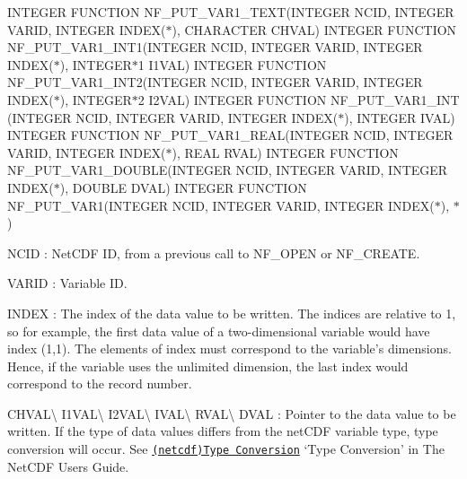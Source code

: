 I\+N\+T\+E\+G\+ER F\+U\+N\+C\+T\+I\+ON N\+F\+\_\+\+P\+U\+T\+\_\+\+V\+A\+R1\+\_\+\+T\+E\+XT(I\+N\+T\+E\+G\+ER N\+C\+ID, I\+N\+T\+E\+G\+ER V\+A\+R\+ID, I\+N\+T\+E\+G\+ER I\+N\+D\+E\+X($\ast$), C\+H\+A\+R\+A\+C\+T\+ER C\+H\+V\+AL) I\+N\+T\+E\+G\+ER F\+U\+N\+C\+T\+I\+ON N\+F\+\_\+\+P\+U\+T\+\_\+\+V\+A\+R1\+\_\+\+I\+N\+T1(I\+N\+T\+E\+G\+ER N\+C\+ID, I\+N\+T\+E\+G\+ER V\+A\+R\+ID, I\+N\+T\+E\+G\+ER I\+N\+D\+E\+X($\ast$), I\+N\+T\+E\+G\+E\+R$\ast$1 I1\+V\+AL) I\+N\+T\+E\+G\+ER F\+U\+N\+C\+T\+I\+ON N\+F\+\_\+\+P\+U\+T\+\_\+\+V\+A\+R1\+\_\+\+I\+N\+T2(I\+N\+T\+E\+G\+ER N\+C\+ID, I\+N\+T\+E\+G\+ER V\+A\+R\+ID, I\+N\+T\+E\+G\+ER I\+N\+D\+E\+X($\ast$), I\+N\+T\+E\+G\+E\+R$\ast$2 I2\+V\+AL) I\+N\+T\+E\+G\+ER F\+U\+N\+C\+T\+I\+ON N\+F\+\_\+\+P\+U\+T\+\_\+\+V\+A\+R1\+\_\+\+I\+NT (I\+N\+T\+E\+G\+ER N\+C\+ID, I\+N\+T\+E\+G\+ER V\+A\+R\+ID, I\+N\+T\+E\+G\+ER I\+N\+D\+E\+X($\ast$), I\+N\+T\+E\+G\+ER I\+V\+AL) I\+N\+T\+E\+G\+ER F\+U\+N\+C\+T\+I\+ON N\+F\+\_\+\+P\+U\+T\+\_\+\+V\+A\+R1\+\_\+\+R\+E\+AL(I\+N\+T\+E\+G\+ER N\+C\+ID, I\+N\+T\+E\+G\+ER V\+A\+R\+ID, I\+N\+T\+E\+G\+ER I\+N\+D\+E\+X($\ast$), R\+E\+AL R\+V\+AL) I\+N\+T\+E\+G\+ER F\+U\+N\+C\+T\+I\+ON N\+F\+\_\+\+P\+U\+T\+\_\+\+V\+A\+R1\+\_\+\+D\+O\+U\+B\+LE(I\+N\+T\+E\+G\+ER N\+C\+ID, I\+N\+T\+E\+G\+ER V\+A\+R\+ID, I\+N\+T\+E\+G\+ER I\+N\+D\+E\+X($\ast$), D\+O\+U\+B\+LE D\+V\+AL) I\+N\+T\+E\+G\+ER F\+U\+N\+C\+T\+I\+ON N\+F\+\_\+\+P\+U\+T\+\_\+\+V\+A\+R1(I\+N\+T\+E\+G\+ER N\+C\+ID, I\+N\+T\+E\+G\+ER V\+A\+R\+ID, I\+N\+T\+E\+G\+ER I\+N\+D\+E\+X($\ast$), $\ast$)

{\ttfamily N\+C\+ID} \+: Net\+C\+DF ID, from a previous call to N\+F\+\_\+\+O\+P\+EN or N\+F\+\_\+\+C\+R\+E\+A\+TE.

{\ttfamily V\+A\+R\+ID} \+: Variable ID.

{\ttfamily I\+N\+D\+EX} \+: The index of the data value to be written. The indices are relative to 1, so for example, the first data value of a two-\/dimensional variable would have index (1,1). The elements of index must correspond to the variable’s dimensions. Hence, if the variable uses the unlimited dimension, the last index would correspond to the record number.

{\ttfamily C\+H\+V\+AL}\textbackslash{} {\ttfamily I1\+V\+AL}\textbackslash{} {\ttfamily I2\+V\+AL}\textbackslash{} {\ttfamily I\+V\+AL}\textbackslash{} {\ttfamily R\+V\+AL}\textbackslash{} {\ttfamily D\+V\+AL} \+: Pointer to the data value to be written. If the type of data values differs from the net\+C\+DF variable type, type conversion will occur. See \href{netcdf.html#Type-Conversion}{\tt (netcdf)Type Conversion} ‘\+Type Conversion’ in The Net\+C\+DF Users Guide.

